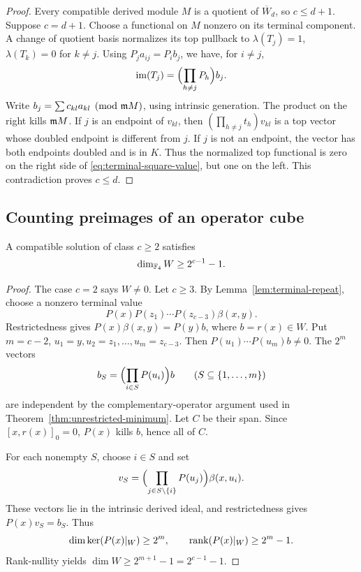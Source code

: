 \begin{proof}
Every compatible derived module \(M\) is a quotient of \(\overline W_d\),
so \(c\le d+1\). Suppose \(c=d+1\). Choose a functional on \(M\)
nonzero on its terminal component. A change of quotient basis normalizes
its top pullback to \(\lambda(T_j)=1\), \(\lambda(T_k)=0\) for
\(k\ne j\).
Using \(P_j a_{ij}=P_i b_j\), we have, for \(i\ne j\),
\begin{equation}\label{eq:terminal-square-value}
 \operatorname{im}(T_j)=\Bigl(\prod_{h\ne j}P_h\Bigr)b_j.
\end{equation}
Write \(b_j=\sum c_{kl}a_{kl}\pmod{\mathfrak m M}\), using intrinsic
generation. The product on the right kills \(\mathfrak m M\).
If \(j\) is an endpoint of \(v_{kl}\), then
\((\prod_{h\ne j}t_h)v_{kl}\) is a top vector whose doubled
endpoint is different from \(j\). If \(j\) is not an endpoint,
the vector has both endpoints doubled and is in \(K\).
Thus the normalized top functional is zero on the right side of
\eqref{eq:terminal-square-value}, but one on the left.
This contradiction proves \(c\le d\).
\end{proof}

\subsection{Counting preimages of an operator cube}

\begin{lemma}\label{lem:compatible-w}
A compatible solution of class \(c\ge2\) satisfies
\[
 \dim_{\mathbb F_4}W\ge2^{c-1}-1.
\]
\end{lemma}
\begin{proof}
The case \(c=2\) says \(W\ne0\). Let \(c\ge3\).
By Lemma~\ref{lem:terminal-repeat}, choose a nonzero terminal value
\[
 P(x)P(z_1)\cdots P(z_{c-3})\beta(x,y).
\]
Restrictedness gives \(P(x)\beta(x,y)=P(y)b\), where
\(b=r(x)\in W\). Put \(m=c-2\),
\(u_1=y,u_2=z_1,\ldots,u_m=z_{c-3}\).
Then \(P(u_1)\cdots P(u_m)b\ne0\).
The \(2^m\) vectors
\[
 b_S=\Bigl(\prod_{i\in S}P(u_i)\Bigr)b
 \qquad(S\subseteq\{1,\ldots,m\})
\]
are independent by the complementary-operator argument used in
Theorem~\ref{thm:unrestricted-minimum}. Let \(C\) be their span.
Since \([x,r(x)]_0=0\), \(P(x)\) kills \(b\), hence all of \(C\).

For each nonempty \(S\), choose \(i\in S\) and set
\[
 v_S=\Bigl(\prod_{j\in S\setminus\{i\}}P(u_j)\Bigr)\beta(x,u_i).
\]
These vectors lie in the intrinsic derived ideal, and restrictedness gives
\(P(x)v_S=b_S\). Thus
\[
 \dim\ker(P(x)|_W)\ge2^m,\qquad
 \operatorname{rank}(P(x)|_W)\ge2^m-1.
\]
Rank-nullity yields \(\dim W\ge2^{m+1}-1=2^{c-1}-1\).
\end{proof}

